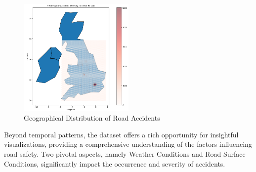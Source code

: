\documentclass{article}
\begin{document}
\begin{figure}[h]
  \centering
  \includegraphics[width=0.5\textwidth]{Images/geographical_distribution.png}
  \caption{Geographical Distribution of Road Accidents}
\end{figure}

Beyond temporal patterns, the dataset offers a rich opportunity for insightful visualizations, providing a
comprehensive understanding of the factors influencing road safety. Two pivotal aspects, namely Weather
Conditions and Road Surface Conditions, significantly impact the occurrence and severity of accidents.
\end{document}
